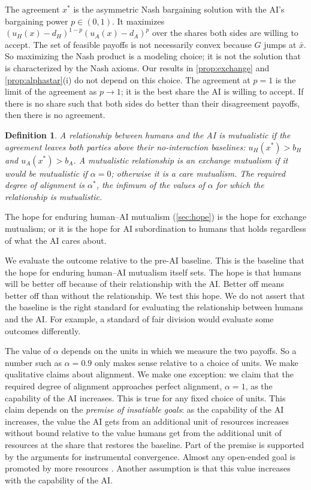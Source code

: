 \documentclass[article, 11pt, reqno]{amsart}
\newtheorem*{definition}{Definition}
\theoremstyle{named}
\newcommand{\bH}{b_H}
\newcommand{\dH}{d_H}
\theoremstyle{plain}
\begin{document}
The agreement $x^*$ is the asymmetric Nash bargaining solution with the AI's bargaining power $p \in (0,1)$. It maximizes $(u_H(x) - \dH)^{1-p}(u_A(x) - d_A)^{p}$ over the shares both sides are willing to accept. The set of feasible payoffs is not necessarily convex because $G$ jumps at $\bar{x}$. So maximizing the Nash product is a modeling choice; it is not the solution that is characterized by the Nash axioms. Our results in \cref{prop:exchange} and \cref{prop:alphastar}(i) do not depend on this choice. The agreement at $p = 1$ is the limit of the agreement as $p \to 1$; it is the best share the AI is willing to accept. If there is no share such that both sides do better than their disagreement payoffs, then there is no agreement.

\begin{definition}
A relationship between humans and the AI is \emph{mutualistic} if the agreement leaves both parties above their no-interaction baselines: $u_H(x^*) > \bH$ and $u_A(x^*) > b_A$. A mutualistic relationship is an \emph{exchange mutualism} if it would be mutualistic if $\alpha = 0$; otherwise it is a \emph{care mutualism}. The \emph{required degree of alignment} is $\alpha^*$, the infimum of the values of $\alpha$ for which the relationship is mutualistic.
\end{definition}

The hope for enduring human--AI mutualism (\cref{sec:hope}) is the hope for exchange mutualism; or it is the hope for AI subordination to humans that holds regardless of what the AI cares about.

We evaluate the outcome relative to the pre-AI baseline. This is the baseline that the hope for enduring human--AI mutualism itself sets. The hope is that humans will be better off because of their relationship with the AI. Better off means better off than without the relationship. We test this hope. We do not assert that the baseline is the right standard for evaluating the relationship between humans and the AI. For example, a standard of fair division would evaluate some outcomes differently.

The value of $\alpha$ depends on the units in which we measure the two payoffs. So a number such as $\alpha = 0.9$ only makes sense relative to a choice of units. We make qualitative claims about alignment. We make one exception: we claim that the required degree of alignment approaches perfect alignment, $\alpha = 1$, as the capability of the AI increases. This is true for any fixed choice of units. This claim depends on the \emph{premise of insatiable goals}: as the capability of the AI increases, the value the AI gets from an additional unit of resources increases without bound relative to the value humans get from the additional unit of resources at the share that restores the baseline. Part of the premise is supported by the arguments for instrumental convergence. Almost any open-ended goal is promoted by more resources \citep{Omohundro2008, Bostrom2012, Turner2021}. Another assumption is that this value increases with the capability of the AI.
\end{document}
